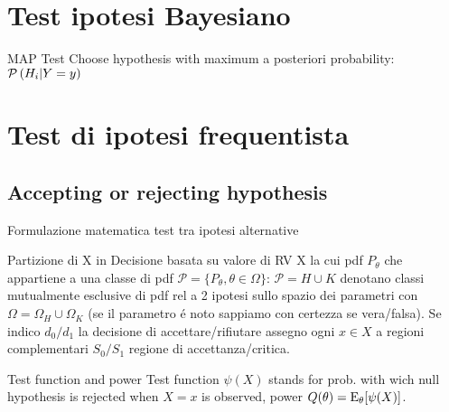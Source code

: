 \section{Test ipotesi Bayesiano}

\begin{frame}{MAP Test}
Choose hypothesis with maximum a posteriori probability: $\operatorname{\mathcal{P}}{(H_i|Y=y)}$
\end{frame}

\section{Test di ipotesi frequentista}


\subsection{Accepting or rejecting hypothesis}
	
\begin{frame}{Formulazione matematica test tra ipotesi alternative}\frameintoc
\begin{block}{Partizione di X in }
Decisione basata su valore di RV X la cui pdf $P_{\theta}$ che appartiene a una classe di pdf $\mathcal{P}=\{P_{\theta}, \theta\in\Omega\}$:  $\mathcal{P}=H\cup K$ denotano classi mutualmente esclusive di pdf rel a 2 ipotesi sullo spazio dei parametri con $\Omega=\Omega_H\cup\Omega_K$ (se il parametro \'e noto sappiamo con certezza se vera/falsa). Se indico $d_0/d_1$ la decisione di accettare/rifiutare assegno ogni $x\in X$ a regioni complementari $S_0/S_1$ regione di accettanza/critica.
\end{block}
\begin{block}{Test function and power}
Test function $\psi(X)$ stands for prob. with wich null hypothesis is rejected when $X=x$ is observed, power $Q(\theta)=\operatorname{E}_{\theta}[\psi(X)]$.
\end{block}
\end{frame}

